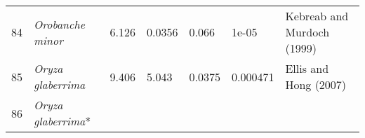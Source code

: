 \documentclass[]{article}
\begin{document}
\begin{longtable}[]{@{}lllllll@{}}
\begin{minipage}[t]{0.05\columnwidth}
84\strut
\end{minipage} & \begin{minipage}[t]{0.23\columnwidth}\raggedright
\emph{Orobanche minor}\strut
\end{minipage} & \begin{minipage}[t]{0.05\columnwidth}\raggedright
6.126\strut
\end{minipage} & \begin{minipage}[t]{0.08\columnwidth}\raggedright
0.0356\strut
\end{minipage} & \begin{minipage}[t]{0.08\columnwidth}\raggedright
0.066\strut
\end{minipage} & \begin{minipage}[t]{0.08\columnwidth}\raggedright
1e-05\strut
\end{minipage} & \begin{minipage}[t]{0.23\columnwidth}\raggedright
Kebreab and Murdoch (1999)\strut
\end{minipage}\tabularnewline
\begin{minipage}[t]{0.05\columnwidth}\raggedright
85\strut
\end{minipage} & \begin{minipage}[t]{0.23\columnwidth}\raggedright
\emph{Oryza glaberrima}\strut
\end{minipage} & \begin{minipage}[t]{0.05\columnwidth}\raggedright
9.406\strut
\end{minipage} & \begin{minipage}[t]{0.08\columnwidth}\raggedright
5.043\strut
\end{minipage} & \begin{minipage}[t]{0.08\columnwidth}\raggedright
0.0375\strut
\end{minipage} & \begin{minipage}[t]{0.08\columnwidth}\raggedright
0.000471\strut
\end{minipage} & \begin{minipage}[t]{0.23\columnwidth}\raggedright
Ellis and Hong (2007)\strut
\end{minipage}\tabularnewline
\begin{minipage}[t]{0.05\columnwidth}\raggedright
86\strut
\end{minipage} & \begin{minipage}[t]{0.23\columnwidth}\raggedright
\emph{Oryza glaberrima}*\strut
\end{minipage} & \begin{minipage}[t]{0.05\columnwidth}\raggedright

\end{minipage}
\end{longtable}
\end{document}
